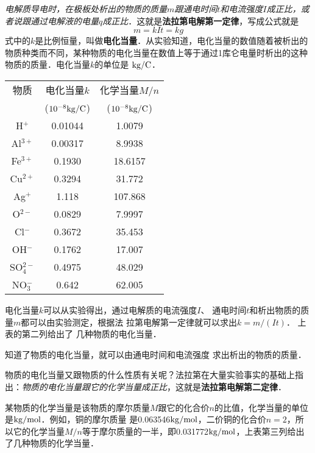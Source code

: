 \textit{电解质导电时，在极板处析出的物质的质量$m$跟通电时间$t$和电流强度$I$成正比，或者说跟通过电解液的电量$q$成正比}．这就是\textbf{法拉第电解第一定律}，写成公式就是
\begin{equation}
    m=kIt=kg
\end{equation}
式中的$k$是比例恒量，叫做\textbf{电化当量}．从实验知道，电化当量的数值随着被析出的物质种类而不同，某种物质的电化当量在数值上等于通过1库仑电量时析出的这种物质的质量．电化当量$k$的单位是
${\rm kg}/{\rm C}$．

\begin{center}
    \begin{tabular}{ccc}
        \hline
        物质  &  电化当量$k$  &  化学当量$M/n$\\
        & ($10^{-8}{\rm kg}/{\rm C}$)& ($10^{-8}{\rm kg}/{\rm C}$)\\
        \hline
H$^+$       &   0.01044    &  1.0079     \\
Al$^{3+}$       &  0.00317     &    8.9938   \\
Fe$^{3+}$       &  0.1930     &  18.6157     \\
Cu$^{2+}$       &  0.3294     &   31.772    \\
Ag$^{+}$       &   1.118    &   107.868    \\
O$^{2-}$       &  0.0829     &   7.9997    \\
Cl$^{-}$       &  0.3672     &   35.453    \\
OH$^{-}$       &  0.1762     &  17.007     \\
SO${}_4^{2-}$       &   0.4975    &  48.029     \\
NO${}_3^{-}$       &  0.642     &  62.005     \\
        \hline
    \end{tabular}
\end{center}


电化当量$k$可以从实验得出，通过电解质的电流强度$I$、
通电时间$t$和析出物质的质量$m$都可以由实验测定，根据法
拉第电解第一定律就可以求出$k=m/(It)$．
上表的第二列给出了
几种物质的电化当量．

知道了物质的电化当量，就可以由通电时间和电流强度
求出析出的物质的质量．

物质的电化当量又跟物质的什么性质有关呢？法拉第在大量实验事实的基础上指出：\textit{物质的电化当量跟它的化学当量成正比}，这就是\textbf{法拉第电解第二定律}．

某物质的化学当量是该物质的摩尔质量$M$跟它的化合价$n$的比值，化学当量的单位是${\rm kg}/{\rm mol}$．例如，铜的摩尔质量
是0.063546${\rm kg}/{\rm mol}$，二价铜的化合价$n=2$，所以它的化学当量$M/n$等于摩尔质量的一半，即0.031772${\rm kg}/{\rm mol}$，上表第三列给出了几种物质的化学当量．

